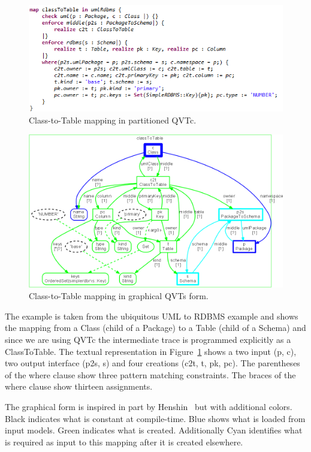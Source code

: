 \documentclass{llncs}
\begin{document}
\begin{figure}[h]
	\centering
	\includegraphics[width=1.0\textwidth]{ClassToTable-qvtp.png}
	\caption{Class-to-Table mapping in partitioned QVTc.}
	\label{fig:ClassToTable.qvtp}
\end{figure}

\begin{figure}[h]
	\centering
	\includegraphics[width=1.0\textwidth]{ClassToTable-qvts.png}
	\caption{Class-to-Table mapping in graphical QVTs form.}
	\label{fig:ClassToTable.qvts}
\end{figure}

The example is taken from the ubiquitous UML to RDBMS example and shows the mapping from a Class (child of a Package) to a Table (child of a Schema) and since we are using QVTc the intermediate trace is programmed explicitly as a ClassToTable. The textual representation in  Figure~\ref{fig:ClassToTable.qvtp} shows a two input (p, c), two output interface (p2s,  s) and four creations (c2t, t, pk, pc). The parentheses of the where clause show three pattern matching constraints. The braces of the where clause show thirteen assignments.

The graphical form is inspired in part by Henshin~\cite{Henshin} but with additional colors. Black indicates what is constant at compile-time. Blue shows what is loaded from input models. Green indicates what is created. Additionally Cyan identifies what is required as input to this mapping after it is created elsewhere.
\end{document}
